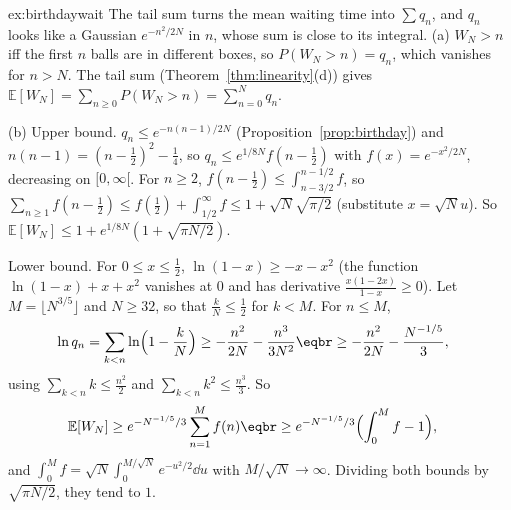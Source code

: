 \begin{solution}{ex:birthdaywait}
\idea The tail sum turns the mean waiting time into $\sum q_n$, and $q_n$ looks like a Gaussian $e^{-n^2/2N}$ in $n$,
whose sum is close to its integral.
\writeup (a) $W_N>n$ iff the first $n$ balls are in different boxes, so $P(W_N>n)=q_n$, which vanishes for $n>N$. The tail
sum (Theorem~\ref{thm:linearity}(d)) gives $\mathbb E[W_N]=\sum_{n\ge0}P(W_N>n)=\sum_{n=0}^Nq_n$.

(b) Upper bound. $q_n\le e^{-n(n-1)/2N}$ (Proposition~\ref{prop:birthday}) and $n(n-1)=(n-\frac12)^2-\frac14$, so
$q_n\le e^{1/8N}f(n-\frac12)$ with $f(x)=e^{-x^2/2N}$, decreasing on $[0,\infty[$. For $n\ge2$, $f(n-\frac12)\le\int_{n-3/2}^{n-1/2}f$, so
$\sum_{n\ge1}f(n-\frac12)\le f(\frac12)+\int_{1/2}^\infty f\le1+\sqrt N\sqrt{\pi/2}$ (substitute $x=\sqrt Nu$). So
$\mathbb E[W_N]\le1+e^{1/8N}(1+\sqrt{\pi N/2})$.

Lower bound. For $0\le x\le\frac12$, $\ln(1-x)\ge-x-x^2$ (the function $\ln(1-x)+x+x^2$ vanishes at $0$ and has derivative
$\frac{x(1-2x)}{1-x}\ge0$). Let $M=\lfloor N^{3/5}\rfloor$ and $N\ge32$, so that $\frac kN\le\frac12$ for $k<M$. For $n\le M$,
\[
\begin{aligned}\ln q_n&=\sum_{k<n}\ln\Bigl(1-\frac kN\Bigr)\ge-\frac{n^2}{2N}-\frac{n^3}{3N^2}\eqbr\ge-\frac{n^2}{2N}-\frac{N^{-1/5}}3,\end{aligned}
\]
using $\sum_{k<n}k\le\frac{n^2}2$ and $\sum_{k<n}k^2\le\frac{n^3}3$. So
\[
\begin{aligned}\mathbb E[W_N]&\ge e^{-N^{-1/5}/3}\sum_{n=1}^Mf(n)\eqbr\ge e^{-N^{-1/5}/3}\Bigl(\int_0^Mf-1\Bigr),\end{aligned}
\]
and $\int_0^Mf=\sqrt N\int_0^{M/\sqrt N}e^{-u^2/2}\dd u$ with $M/\sqrt N\to\infty$. Dividing both bounds by $\sqrt{\pi N/2}$, they tend to
$1$.
\end{solution}

